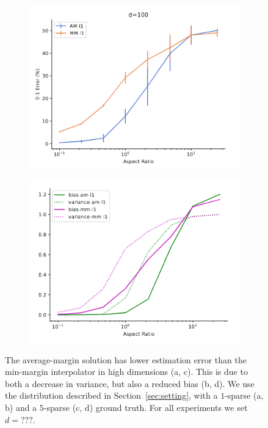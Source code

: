 \begin{figure}[t]
\begin{subfigure}[t]{0.24\linewidth}
    \includegraphics[width=\columnwidth]{figures/estim_err_s5.png}
    \label{fig:estim_err_s5}
    \caption{}
  \end{subfigure}
  \hfill
  \begin{subfigure}[t]{0.24\linewidth}
    \centering
    \includegraphics[width=\columnwidth]{figures/bias_variance_s5.png}
    \label{fig:bias_variance_s5}
    \caption{}
  \end{subfigure}

  \caption{The average-margin solution has lower estimation error than the
    min-margin interpolator in high dimensions (a, c). This is due to both a
    decrease in variance, but also a reduced bias (b, d). We use the
    distribution described in Section~\ref{sec:setting}, with a $1$-sparse (a,
    b) and a $5$-sparse (c, d) ground truth. For all experiments we set
  $d=???$.}
  \label{fig:gmm_experiments}

\end{figure}



